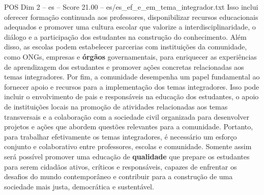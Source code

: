 \begin{textsample}{POS Dim 2 – es – Score 21.00 – es/es\_ef\_e\_em\_tema\_integrador.txt}
Isso inclui oferecer formação continuada aos professores, disponibilizar recursos educacionais adequados e promover uma cultura escolar que valorize a interdisciplinaridade, o diálogo e a participação dos estudantes na construção do conhecimento.
Além disso, as escolas podem estabelecer parcerias com instituições da comunidade, como ONGs, empresas e \textbf{órgãos} governamentais, para enriquecer as experiências de aprendizagem dos estudantes e promover ações concretas relacionadas aos temas integradores.
Por fim, a comunidade desempenha um papel fundamental ao fornecer apoio e recursos para a implementação dos temas integradores.
Isso pode incluir o envolvimento de pais e responsáveis na educação dos estudantes, o apoio de instituições locais na promoção de atividades relacionadas aos temas transversais e a colaboração com a sociedade civil organizada para desenvolver projetos e ações que abordem questões relevantes para a comunidade.
Portanto, para trabalhar efetivamente os temas integradores, é necessário um esforço conjunto e colaborativo entre professores, escolas e comunidade.
Somente assim será possível promover uma educação de \textbf{qualidade} que prepare os estudantes para serem cidadãos ativos, críticos e responsáveis, capazes de enfrentar os desafios do mundo contemporâneo e contribuir para a construção de uma sociedade mais justa, democrática e sustentável.

\end{textsample}
